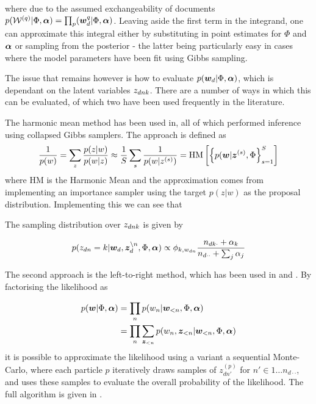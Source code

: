 where due to the assumed exchangeability of documents $p(\mathcal{W}^{(q)}|\Phi, \bm \alpha) = \prod_ p(\bm w_d^{q}|\Phi, \bm \alpha)$. Leaving aside the first term in the integrand, one can approximate this integral either by substituting in point estimates for $\Phi$ and $\bm \alpha$ or sampling from the posterior - the latter being particularly easy in cases where the model parameters have been fit using Gibbs sampling.

The issue that remains however is how to evaluate $p(\bm w_d|\Phi, \bm \alpha)$, which is dependant on the latent variables ${ z_{dnk} }$. There are a number of ways in which this can be evaluated, of which two have been used frequently in the literature.

The harmonic mean method has been used in\cite{Griffiths2004}\cite{Griffiths2005}\cite{Wallach2006}, all of which performed inference using collapsed Gibbs samplers. The approach is defined as
\begin{align}
\frac{1}{ {p(w)} } = \sum_z \frac{p(z|w)}{p(w|z)} \approx \frac{1}{ {S} } \sum_s \frac{1}{ {p(w|{ z }^{(s)})} }
=  \text{HM}\left[ \left\{ p(\bm w|{ \bm z }^{(s)}, \Phi \right\}_{s=1}^{S}  \right]
\end{align}
where HM is the Harmonic Mean and the approximation comes from implementing an importance sampler using the target $p(z|w)$ as the proposal distribution. Implementing this we can see that 

The sampling distribution over ${ z_{dnk} }$ is given by

\begin{align}
p(z_{dn} = k | \bm w_d, \bm z_d^{\setminus n}, \Phi, \bm \alpha) \propto \phi_{k,{w_{dn}}}\frac{n_{dk\cdot} + \alpha_k}{n_{d\cdot\cdot} + \sum_j \alpha_j}
\end{align}

The second approach is the left-to-right method, which has been used in \cite{Mimno2011} and \cite{Mimno2012a}. By factorising the likelihood as

\begin{align}
p(\bm w|\Phi, \bm \alpha) & = \prod_n p(w_n | \bm w_{<n}, \Phi, \bm \alpha) \\
& = \prod_n \sum_{\bm z_{<n}} p(w_n, \bm z_{<n}| \bm w_{<n}, \Phi, \bm \alpha)
\end{align}
it is possible to approximate the likelihood using a variant a sequential Monte-Carlo, where each particle $p$ iteratively draws samples of $z^{(p)}_{dn'}$ for $n' \in 1 \ldots n_{d\cdot\cdot}$, and uses these samples to evaluate the overall probability of the likelihood. The full algorithm is given in \cite{Wallach2009}.


